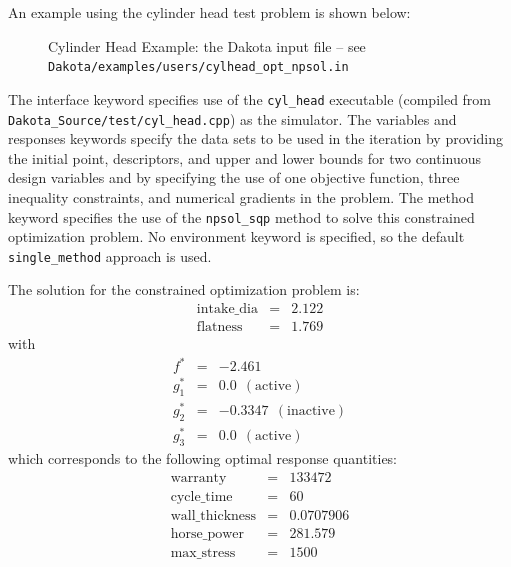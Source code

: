 An example using the cylinder head test problem is shown below:
\begin{figure}[ht!]
  \centering
  \begin{small}
    \begin{bigbox}
    \end{bigbox}
  \end{small}
  \caption{Cylinder Head Example: the Dakota input file --
see \texttt{Dakota/examples/users/cylhead\_opt\_npsol.in} }
  \label{additional:cylinder_head}
\end{figure}

The interface keyword specifies use of the \texttt{cyl\_head}
executable (compiled from \texttt{Dakota\_Source/test/cyl\_head.cpp}) as the
simulator. The variables and responses keywords specify the data sets
to be used in the iteration by providing the initial point,
descriptors, and upper and lower bounds for two continuous design
variables and by specifying the use of one objective function, three
inequality constraints, and numerical gradients in the problem. The
method keyword specifies the use of the \texttt{npsol\_sqp} method to
solve this constrained optimization problem. No environment keyword is
specified, so the default \texttt{single\_method} approach is used.

The solution for the constrained optimization problem is:
\begin{eqnarray*}
    \mathrm{intake\_dia} &=& 2.122 \\
    \mathrm{flatness}    &=& 1.769
\end{eqnarray*}
with
\begin{eqnarray*}
      f^{\ast} &=& -2.461 \\
    g_1^{\ast} &=&  0.0    ~~\mathrm{(active)} \\
    g_2^{\ast} &=& -0.3347 ~~\mathrm{(inactive)} \\
    g_3^{\ast} &=&  0.0    ~~\mathrm{(active)}
\end{eqnarray*}
which corresponds to the following optimal response quantities:
\begin{eqnarray*}
    \mathrm{warranty}        &=& 133472 \\
    \mathrm{cycle\_time}     &=& 60 \\
    \mathrm{wall\_thickness} &=& 0.0707906 \\
    \mathrm{horse\_power}    &=& 281.579 \\
    \mathrm{max\_stress}     &=& 1500
\end{eqnarray*}

